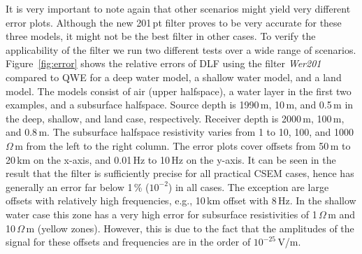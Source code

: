 \documentclass[paper,twocolumn,twoside]{geophysics}
\begin{document}
It is very important to note again that other scenarios might yield very
different error plots. Although the new 201\,pt filter proves to be very
accurate for these three models, it might not be the best filter in other
cases. To verify the applicability of the filter we run two different tests
over a wide range of scenarios. Figure~\ref{fig:error} shows the relative
errors of DLF using the filter \emph{Wer201} compared to QWE for a deep water
model, a shallow water model, and a land model. The models consist of air
(upper halfspace), a water layer in the first two examples, and a subsurface
halfspace. Source depth is 1990\,m, 10\,m, and 0.5\,m in the deep, shallow, and
land case, respectively. Receiver depth is 2000\,m, 100\,m, and 0.8\,m. The
subsurface halfspace resistivity varies from 1 to 10, 100, and
1000\,$\Omega\,$m from the left to the right column. The error plots cover
offsets from 50\,m to 20\,km on the x-axis, and 0.01\,Hz to 10\,Hz on the
y-axis. It can be seen in the result that the filter is sufficiently precise
for all practical CSEM cases, hence has generally an error far below 1\,\%
($10^{-2}$) in all cases. The exception are large offsets with relatively high
frequencies, e.g., 10\,km offset with 8\,Hz. In the shallow water case this
zone has a very high error for subsurface resistivities of 1\,$\Omega\,$m and
10\,$\Omega\,$m (yellow zones). However, this is due to the fact that the
amplitudes of the signal for these offsets and frequencies are in the order of
$10^{-25}\,$V/m.
%
%
\end{document}
